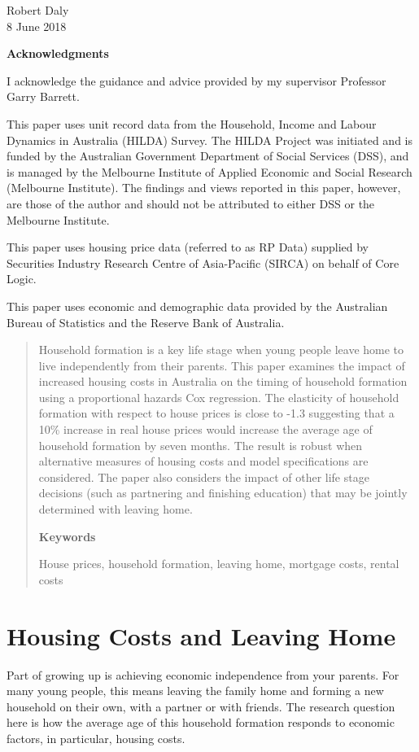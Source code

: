\documentclass[12pt]{article}
\newcommand{\heading}[1] {\begin{center} \textbf{#1} \end{center}}
\begin{document}
Robert Daly\\
8 June 2018

\pagebreak
\heading{Acknowledgments}
I acknowledge the guidance and advice provided by my supervisor Professor Garry Barrett.

This paper uses unit record data from the Household, Income and Labour Dynamics in Australia (HILDA) Survey. The HILDA Project was initiated and is funded by the Australian Government Department of Social Services (DSS), and is managed by the Melbourne Institute of Applied Economic and Social Research (Melbourne Institute). The findings and views reported in this paper, however, are those of the author and should not be attributed to either DSS or the Melbourne Institute.

This paper uses housing price data (referred to as RP Data) supplied by Securities Industry Research Centre of Asia-Pacific (SIRCA) on behalf of Core Logic.

This paper uses economic and demographic data provided by the Australian Bureau of Statistics and the Reserve Bank of Australia.

\pagebreak

\begin{abstract}
Household formation is a key life stage when young people leave home to live independently from their parents. This paper examines the impact of increased housing costs in Australia on the timing of household formation using a proportional hazards Cox regression. The elasticity of household formation with respect to house prices is close to -1.3 suggesting that a 10\% increase in real house prices would increase the average age of household formation by seven months. The result is robust when alternative measures of housing costs and model specifications are considered. The paper also considers the impact of other life stage decisions (such as partnering and finishing education) that may be jointly determined with leaving home.

\heading{Keywords}
House prices, household formation, leaving home, mortgage costs, rental costs
\end{abstract}

\section{Housing Costs and Leaving Home}
Part of growing up is achieving economic independence from your parents. For many young people, this means leaving the family home and forming a new household on their own, with a partner or with friends. The research question here is how the average age of this household formation responds to economic factors, in particular, housing costs.
\end{document}
